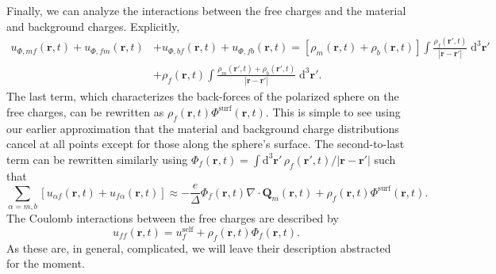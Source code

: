 \documentclass{article}
\begin{document}
Finally, we can analyze the interactions between the free charges and the material and background charges. Explicitly,
\begin{equation}
\begin{split}
u_{\Phi,mf}(\mathbf{r},t) + u_{\Phi,fm}(\mathbf{r},t) &+ u_{\Phi,bf}(\mathbf{r},t) + u_{\Phi,fb}(\mathbf{r},t) = \left[\rho_m(\mathbf{r},t) + \rho_b(\mathbf{r},t)\right]\int\frac{\rho_f(\mathbf{r}',t)}{|\mathbf{r} - \mathbf{r}'|}\;\mathrm{d}^3\mathbf{r}'\\
&+ \rho_f(\mathbf{r},t)\int\frac{\rho_m(\mathbf{r}',t) + \rho_b(\mathbf{r}',t)}{|\mathbf{r} - \mathbf{r}'|}\;\mathrm{d}^3\mathbf{r}'.
\end{split}
\end{equation}
The last term, which characterizes the back-forces of the polarized sphere on the free charges, can be rewritten as $\rho_f(\mathbf{r},t)\Phi^\mathrm{surf}(\mathbf{r},t)$. This is simple to see using our earlier approximation that the material and background charge distributions cancel at all points except for those along the sphere's surface. The second-to-last term can be rewritten similarly using $\Phi_f(\mathbf{r},t) = \int\mathrm{d}^3\mathbf{r}'\,\rho_f(\mathbf{r}',t)/|\mathbf{r} - \mathbf{r}'|$ such that
\begin{equation}
\sum_{\alpha = m,b}\left[u_{\alpha f}(\mathbf{r},t) + u_{f\alpha}(\mathbf{r},t)\right] \approx -\frac{e}{\Delta}\Phi_f(\mathbf{r},t)\nabla\cdot\mathbf{Q}_m(\mathbf{r},t) + \rho_f(\mathbf{r},t)\Phi^\mathrm{surf}(\mathbf{r},t).
\end{equation}
The Coulomb interactions between the free charges are described by
\begin{equation}
u_{ff}(\mathbf{r},t) = u_f^\mathrm{self} + \rho_f(\mathbf{r},t)\Phi_f(\mathbf{r},t).
\end{equation}
As these are, in general, complicated, we will leave their description abstracted for the moment.
\end{document}
